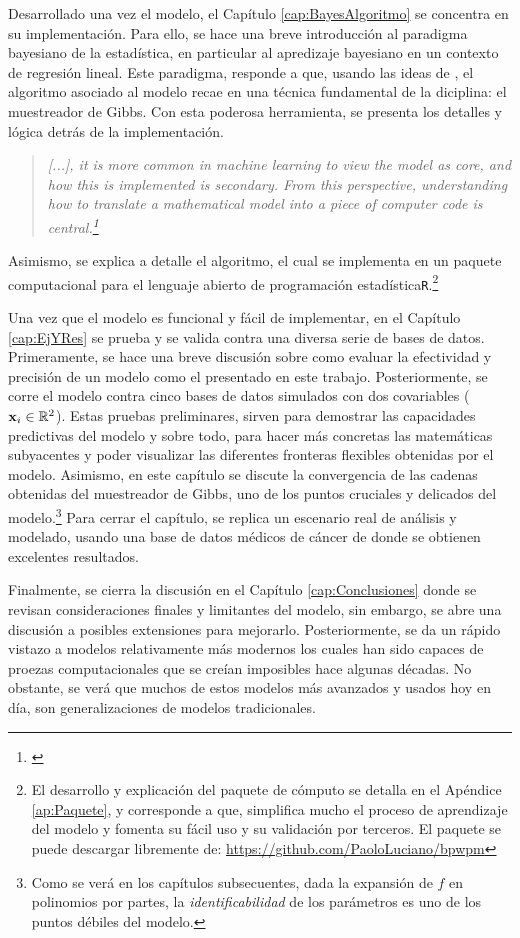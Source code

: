 \documentclass[../Main/Main.tex]{subfiles}
\begin{document}
Desarrollado una vez el modelo, el Capítulo \ref{cap:BayesAlgoritmo} se concentra en su implementación. Para ello, se hace una breve introducción al paradigma bayesiano de la estadística, en particular al apredizaje bayesiano en un contexto de regresión lineal. Este paradigma, responde a que, usando las ideas de \citet{albert1993bayesian}, el algoritmo asociado al modelo recae en una técnica fundamental de la diciplina: el muestreador de Gibbs. Con esta poderosa herramienta, se presenta los detalles y lógica detrás de la implementación.
\begin{quote}
	\textit{[...], it is more common in machine learning to view the model as core, and how this is implemented
is secondary. From this perspective, understanding how to translate a mathematical model into a piece of
computer code is central.\footnote{\citet{barber2012bayesian}}}
\end{quote}
Asimismo, se explica a detalle el algoritmo, el cual se implementa en un paquete computacional para el lenguaje abierto de programación estadística\verb|R|.\footnote{El desarrollo y explicación del paquete de cómputo se detalla en el Apéndice \ref{ap:Paquete}, y corresponde a que, simplifica mucho el proceso de aprendizaje del modelo y fomenta su fácil uso y su validación por terceros. El paquete se puede descargar libremente de: \url{https://github.com/PaoloLuciano/bpwpm}}

Una vez que el modelo es funcional y fácil de implementar, en el Capítulo \ref{cap:EjYRes} se prueba y se valida contra una diversa serie de bases de datos. Primeramente, se hace una breve discusión sobre como evaluar la efectividad y precisión de un modelo como el presentado en este trabajo. Posteriormente, se corre el modelo contra cinco bases de datos simulados con dos covariables ($\mathbf{x}_i \in \mathbb{R}^2$). Estas pruebas preliminares, sirven para demostrar las capacidades predictivas del modelo y sobre todo, para hacer más concretas las matemáticas subyacentes y poder visualizar las diferentes fronteras flexibles obtenidas por el modelo. Asimismo, en este capítulo se discute la convergencia de las cadenas obtenidas del muestreador de Gibbs, uno de los puntos cruciales y delicados del modelo.\footnote{Como se verá en los capítulos subsecuentes, dada la expansión de $f$ en polinomios por partes, la \textit{identificabilidad} de los parámetros es uno de los puntos débiles del modelo.} Para cerrar el capítulo, se replica un escenario real de análisis y modelado, usando una base de datos médicos de cáncer de donde se obtienen excelentes resultados.

Finalmente, se cierra la discusión en el Capítulo \ref{cap:Conclusiones} donde se revisan consideraciones finales y limitantes del modelo, sin embargo, se abre una discusión a posibles extensiones para mejorarlo. Posteriormente, se da un rápido vistazo a modelos relativamente más modernos los cuales han sido capaces de proezas computacionales que se creían imposibles hace algunas décadas. No obstante, se verá que muchos de estos modelos más avanzados y usados hoy en día, son generalizaciones de modelos tradicionales. 
\end{document}
